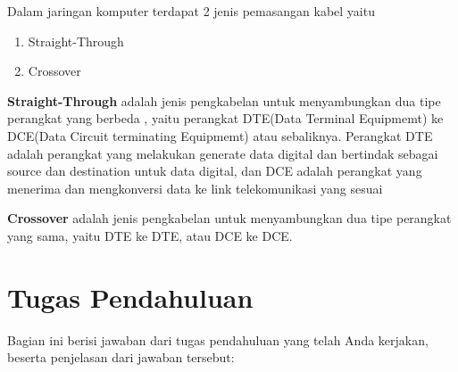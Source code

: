 Dalam jaringan komputer terdapat 2 jenis pemasangan kabel yaitu
\begin{enumerate}
	\item Straight-Through
	\item Crossover
\end{enumerate}

\textbf{Straight-Through} adalah jenis pengkabelan untuk menyambungkan dua tipe perangkat yang berbeda
, yaitu perangkat DTE(Data Terminal Equipmemt) ke DCE(Data Circuit terminating Equipmemt) atau sebaliknya.
Perangkat DTE adalah perangkat yang melakukan generate data digital dan bertindak sebagai source dan destination
untuk data digital, dan DCE adalah perangkat yang menerima dan mengkonversi data ke link telekomunikasi
yang sesuai

\textbf{Crossover} adalah jenis pengkabelan untuk menyambungkan dua tipe perangkat yang sama, yaitu DTE ke
DTE, atau DCE ke DCE.


\section{Tugas Pendahuluan}
Bagian ini berisi jawaban dari tugas pendahuluan yang telah Anda kerjakan, beserta penjelasan dari jawaban tersebut:

